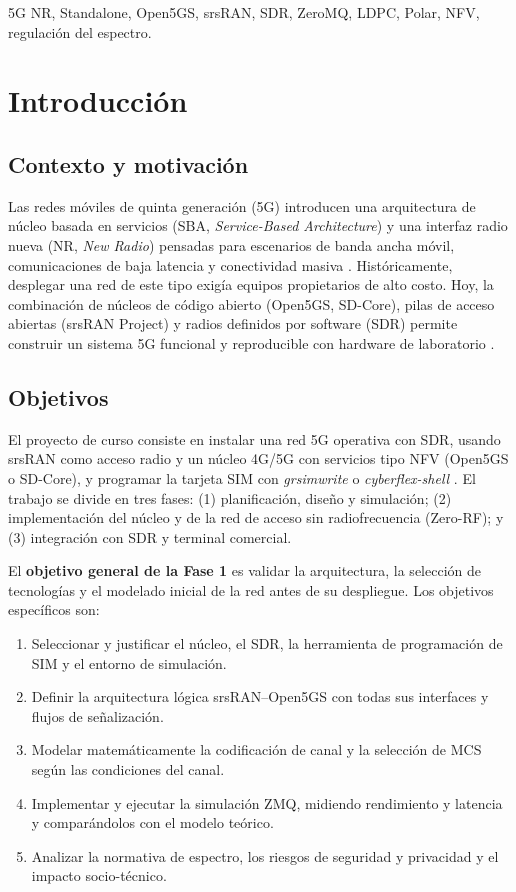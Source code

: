 \documentclass[conference]{IEEEtran}
\begin{document}
\begin{IEEEkeywords}
5G NR, Standalone, Open5GS, srsRAN, SDR, ZeroMQ, LDPC, Polar, NFV, regulación del espectro.
\end{IEEEkeywords}

\section{Introducción}
\label{sec:intro}

\subsection{Contexto y motivación}
Las redes móviles de quinta generación (5G) introducen una arquitectura de núcleo basada en servicios (SBA, \textit{Service-Based Architecture}) y una interfaz radio nueva (NR, \textit{New Radio}) pensadas para escenarios de banda ancha móvil, comunicaciones de baja latencia y conectividad masiva \cite{itum2083,ts23501,dahlman}. Históricamente, desplegar una red de este tipo exigía equipos propietarios de alto costo. Hoy, la combinación de núcleos de código abierto (Open5GS, SD-Core), pilas de acceso abiertas (srsRAN Project) y radios definidos por software (SDR) permite construir un sistema 5G funcional y reproducible con hardware de laboratorio \cite{srsran,open5gs,sdcore}.

\subsection{Objetivos}
El proyecto de curso consiste en instalar una red 5G operativa con SDR, usando srsRAN como acceso radio y un núcleo 4G/5G con servicios tipo NFV (Open5GS o SD-Core), y programar la tarjeta SIM con \textit{grsimwrite} o \textit{cyberflex-shell} \cite{grsim,cyberflex}. El trabajo se divide en tres fases: (1) planificación, diseño y simulación; (2) implementación del núcleo y de la red de acceso sin radiofrecuencia (Zero-RF); y (3) integración con SDR y terminal comercial.

El \textbf{objetivo general de la Fase 1} es validar la arquitectura, la selección de tecnologías y el modelado inicial de la red antes de su despliegue. Los objetivos específicos son:
\begin{enumerate}
  \item Seleccionar y justificar el núcleo, el SDR, la herramienta de programación de SIM y el entorno de simulación.
  \item Definir la arquitectura lógica srsRAN--Open5GS con todas sus interfaces y flujos de señalización.
  \item Modelar matemáticamente la codificación de canal y la selección de MCS según las condiciones del canal.
  \item Implementar y ejecutar la simulación ZMQ, midiendo rendimiento y latencia y comparándolos con el modelo teórico.
  \item Analizar la normativa de espectro, los riesgos de seguridad y privacidad y el impacto socio-técnico.
\end{enumerate}
\end{document}
